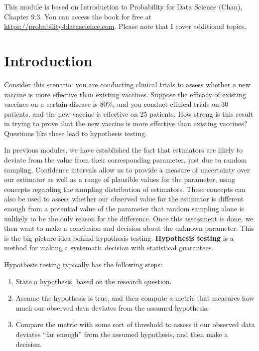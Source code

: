 \documentclass[
]{book}
\providecommand{\tightlist}{%
  \setlength{\itemsep}{0pt}\setlength{\parskip}{0pt}}
\begin{document}
This module is based on Introduction to Probability for Data Science (Chan), Chapter 9.3. You can access the book for free at \url{https://probability4datascience.com}. Please note that I cover additional topics.

\section{Introduction}\label{introduction-5}

Consider this scenario: you are conducting clinical trials to assess whether a new vaccine is more effective than existing vaccines. Suppose the efficacy of existing vaccines on a certain disease is 80\%, and you conduct clinical trials on 30 patients, and the new vaccine is effective on 25 patients. How strong is this result in trying to prove that the new vaccine is more effective than existing vaccines? Questions like these lead to hypothesis testing.

In previous modules, we have established the fact that estimators are likely to deviate from the value from their corresponding parameter, just due to random sampling. Confidence intervals allow us to provide a measure of uncertainty over our estimator as well as a range of plausible values for the parameter, using concepts regarding the sampling distribution of estimators. These concepts can also be used to assess whether our observed value for the estimator is different enough from a potential value of the parameter that random sampling alone is unlikely to be the only reason for the difference. Once this assessment is done, we then want to make a conclusion and decision about the unknown parameter. This is the big picture idea behind hypothesis testing. \textbf{Hypothesis testing} is a method for making a systematic decision with statistical guarantees.

Hypothesis testing typically has the following steps:

\begin{enumerate}
\def\labelenumi{\arabic{enumi}.}
\tightlist
\item
  State a hypothesis, based on the research question.
\item
  Assume the hypothesis is true, and then compute a metric that measures how much our observed data deviates from the assumed hypothesis.
\item
  Compare the metric with some sort of threshold to assess if our observed data deviates ``far enough'' from the assumed hypothesis, and then make a decision.
\end{enumerate}
\end{document}
